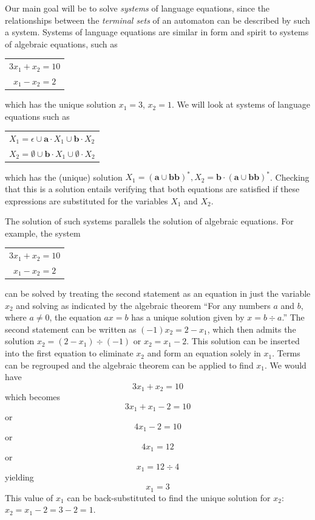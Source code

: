Our main goal will be to solve \emph{systems} of language equations, since the
relationships between the \emph{terminal sets} of an automaton can be described
by such a system. Systems of language equations are similar in form and spirit
to systems of algebraic equations, such as
\begin{center}\begin{tabular}{c}
$3x_1 + x_2 = 10$ \\
$x_1 - x_2 = 2$
\end{tabular}\end{center}
which has the unique solution $x_1 = 3$, $x_2 = 1$. We will look at systems of
language equations such as
\begin{center}\begin{tabular}{l}
$X_1 = \epsilon \cup \pmb{a} \cdot X_1 \cup \pmb{b} \cdot X_2$ \\
$X_2 = \emptyset \cup \pmb{b} \cdot X_1 \cup \emptyset \cdot X_2$
\end{tabular}\end{center}
which has the (unique) solution $X_1=(\pmb{a}\cup\pmb{bb})^*,X_2=\pmb{b}\cdot(
\pmb{a}\cup\pmb{bb})^*$. Checking that this is a solution entails verifying that
both equations are satisfied if these expressions are substituted for the
variables $X_1$ and $X_2$.

The solution of such systems parallels the solution of algebraic equations.
For example, the system
\begin{center}\begin{tabular}{c}
$3x_1 + x_2 = 10$ \\
$x_1 - x_2 = 2$
\end{tabular}\end{center}
can be solved by treating the second statement as an equation in just the
variable $x_2$ and solving as indicated by the algebraic theorem ``For any
numbers $a$ and $b$, where $a \not= 0$, the equation $ax = b$ has a unique
solution given by $x = b \div a$.'' The second statement can be written as
$(-1)x_2 = 2 - x_1$, which then admits the solution $x_2=(2-x_1)\div(-1)$ or
$x_2=x_1-2$. This solution can be inserted into the first equation to eliminate
$x_2$ and form an equation solely in $x_1$. Terms can be regrouped and the
algebraic theorem can be applied to find $x_1$. We would have
\[ 3x_1 + x_2 = 10 \]
which becomes
\[ 3x_1 + x_1 - 2 = 10 \]
or
\[ 4x_1 - 2 = 10 \]
or
\[ 4x_1 = 12 \]
or
\[ x_1 = 12 \div 4 \]
yielding
\[ x_1 = 3 \]
This value of $x_1$ can be back-substituted to find the unique solution for
$x_2$: $x_2=x_1-2=3-2=1$.

